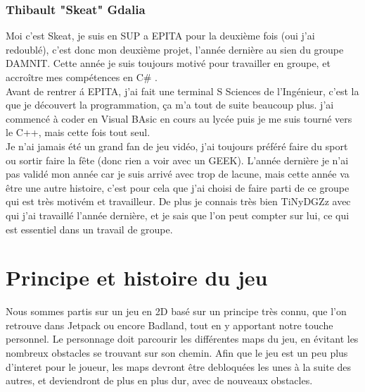\documentclass [11pt]{report}
\begin{document}
	
		
		
		\subsection {Thibault "Skeat" Gdalia}

			Moi c'est Skeat, je suis en SUP a EPITA pour la deuxi\`eme fois (oui j'ai redoubl\'e),  c'est donc mon deuxi\`eme projet, l'ann\'ee derni\`ere au sien du groupe DAMNIT. Cette ann\'ee je suis toujours motiv\'e pour travailler en groupe, et accro\^itre mes comp\'etences en C\# . 
		\\ \indent  Avant de rentrer \'a EPITA, j'ai fait une terminal S Sciences de l'Ing\'enieur, c'est la que je découvert la programmation, ça m'a tout de suite beaucoup plus. j'ai commenc\'e à coder en Visual BAsic en cours au lyc\'ee puis je me suis tourn\'e vers le C++, mais cette fois tout seul.\\
		 \indent Je n'ai jamais \'et\'e un grand fan de jeu vid\'eo, j'ai toujours pr\'ef\'er\'e faire du sport ou sortir faire la f\^ete (donc rien a voir avec un GEEK). L'ann\'ee derni\`ere je n'ai pas valid\'e mon ann\'ee car je suis arriv\'e avec trop de lacune, mais cette ann\'ee va \^etre une autre histoire, c'est pour cela que j'ai choisi  de 				faire parti de ce groupe qui est tr\`es motiv\'em et travailleur. De plus je connais tr\`es bien TiNyDGZz avec qui j'ai travaill\'e l'ann\'ee derni\`ere, et je sais que l'on peut compter sur lui, ce qui est essentiel dans un travail de groupe.\\\vspace{10mm}
	
	

\chapter{Principe et histoire du jeu}

\indent Nous sommes partis sur un jeu en 2D bas\'e sur un principe tr\`es connu, que l'on retrouve dans Jetpack ou encore Badland, tout en y apportant notre touche personnel. Le personnage doit parcourir les différentes maps du jeu, en évitant les nombreux obstacles se trouvant sur son chemin. Afin que le jeu est un peu plus d'interet pour le joueur, les maps devront être debloquées les unes à la suite des autres, et deviendront de plus en plus dur, avec de nouveaux obstacles.\\
\end{document}
